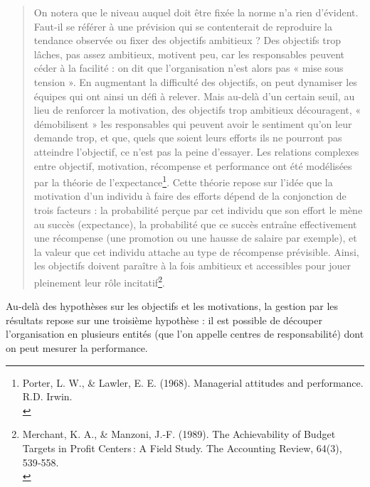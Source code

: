\documentclass{tufte-handout}
\begin{document}
\begin{enumerate}
\begin{quote}
On notera que le niveau auquel doit être fixée la norme n’a rien d’évident. Faut-il se référer à une prévision qui se contenterait de reproduire la tendance observée ou fixer des objectifs ambitieux ? Des objectifs trop lâches, pas assez ambitieux, motivent peu, car les responsables peuvent céder à la facilité : on dit que l’organisation n’est alors pas « mise sous tension ». En augmentant la difficulté des objectifs, on peut dynamiser les équipes qui ont ainsi un défi à relever. Mais au-delà d’un certain seuil, au lieu de renforcer la motivation, des objectifs trop ambitieux découragent, « démobilisent » les responsables qui peuvent avoir le sentiment qu’on leur demande trop, et que, quels que soient leurs efforts ils ne pourront pas atteindre l’objectif, ce n’est pas la peine d’essayer. Les relations complexes entre objectif, motivation, récompense et performance ont été modélisées par la théorie de l’expectance\footnote{Porter, L. W., \& Lawler, E. E. (1968). Managerial attitudes and performance. R.D. Irwin.\\}. Cette théorie repose sur l’idée que la motivation d’un individu à faire des efforts dépend de la conjonction de trois facteurs : la probabilité perçue par cet individu que son effort le mène au succès (expectance), la probabilité que ce succès entraîne effectivement une récompense (une promotion ou une hausse de salaire par exemple), et la valeur que cet individu attache au type de récompense prévisible. Ainsi, les objectifs doivent paraître à la fois ambitieux et accessibles pour jouer pleinement leur rôle incitatif\footnote{Merchant, K. A., \& Manzoni, J.-F. (1989). The Achievability of Budget Targets in Profit Centers : A Field Study. The Accounting Review, 64(3), 539‑558.\\}.\\
\end{quote}

Au-delà des hypothèses sur les objectifs et les motivations, la gestion par les résultats repose sur une troisième hypothèse : il est possible de découper l'organisation en plusieurs entités (que l'on appelle centres de responsabilité) dont on peut mesurer la performance.\\
\end{enumerate}
\end{document}
